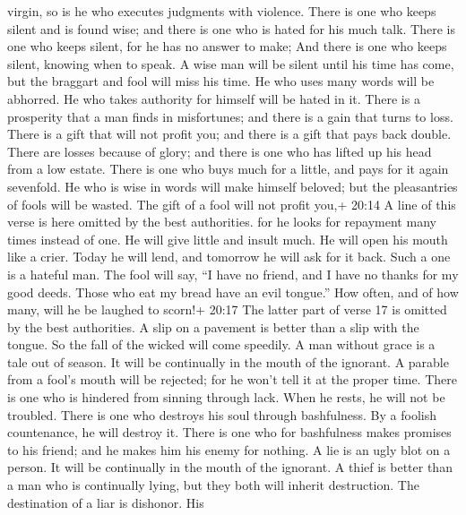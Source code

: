 virgin, so is he who executes judgments with violence. 
There is one who keeps silent and is found wise; and there is one who is
hated for his much talk.  There is one who keeps silent, for
he has no answer to make; And there is one who keeps silent, knowing
when to speak.  A wise man will be silent until his time has
come, but the braggart and fool will miss his time.  He who
uses many words will be abhorred. He who takes authority for himself
will be hated in it.  There is a prosperity that a man finds
in misfortunes; and there is a gain that turns to loss. 
There is a gift that will not profit you; and there is a gift that pays
back double.  There are losses because of glory; and there
is one who has lifted up his head from a low estate.  There
is one who buys much for a little, and pays for it again sevenfold.
 He who is wise in words will make himself beloved; but the
pleasantries of fools will be wasted.  The gift of a fool
will not profit you,+ 20:14 A line of this verse is here omitted by the
best authorities. for he looks for repayment many times instead of one.
 He will give little and insult much. He will open his
mouth like a crier. Today he will lend, and tomorrow he will ask for it
back. Such a one is a hateful man.  The fool will say, ``I
have no friend, and I have no thanks for my good deeds. Those who eat my
bread have an evil tongue.''  How often, and of how many,
will he be laughed to scorn!+ 20:17 The latter part of verse 17 is
omitted by the best authorities.  A slip on a pavement is
better than a slip with the tongue. So the fall of the wicked will come
speedily.  A man without grace is a tale out of season. It
will be continually in the mouth of the ignorant.  A
parable from a fool's mouth will be rejected; for he won't tell it at
the proper time.  There is one who is hindered from sinning
through lack. When he rests, he will not be troubled. 
There is one who destroys his soul through bashfulness. By a foolish
countenance, he will destroy it.  There is one who for
bashfulness makes promises to his friend; and he makes him his enemy for
nothing.  A lie is an ugly blot on a person. It will be
continually in the mouth of the ignorant.  A thief is
better than a man who is continually lying, but they both will inherit
destruction.  The destination of a liar is dishonor. His
